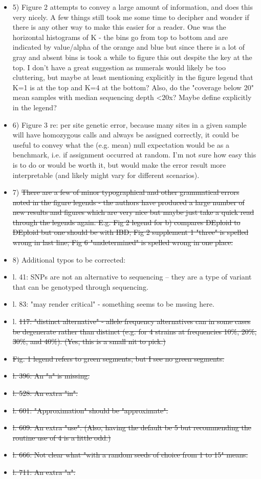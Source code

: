 \documentclass[11pt,twoside,a4paper]{article}
\begin{document}
\begin{itemize}
    \item 5) Figure 2 attempts to convey a large amount of information, and does this very nicely. A few things still took me some time to decipher and wonder if there is any other way to make this easier for a reader. One was the horizontal histograms of K - the bins go from top to bottom and are indicated by value/alpha of the orange and blue but since there is a lot of gray and absent bins is took a while to figure this out despite the key at the top. I don't have a great suggestion as numerals would likely be too cluttering, but maybe at least mentioning explicitly in the figure legend that K=1 is at the top and K=4 at the bottom? Also, do the "coverage below 20" mean samples with median sequencing depth <20x? Maybe define explicitly in the legend?

    \item 6) Figure 3 re: per site genetic error, because many sites in a given sample will have homozygous calls and always be assigned correctly, it could be useful to convey what the (e.g. mean) null expectation would be as a benchmark, i.e. if assignment occurred at random. I'm not sure how easy this is to do or would be worth it, but would make the error result more interpretable (and likely might vary for different scenarios).

    \item 7) \st{There are a few of minor typographical and other grammatical errors noted in the figure legends - the authors have produced a large number of new results and figures which are very nice but maybe just take a quick read through the legends again. E.g. Fig 2 legend for b) compares DEploid to DEploid but one should be with IBD; Fig 2 supplement 1 "three" is spelled wrong in last line; Fig 6 "undetermined" is spelled wrong in one place.}

    \item 8) Additional typos to be corrected:

\item l. 41: SNPs are not an alternative to sequencing -- they are a type of variant that can be genotyped through sequencing.
\item l. 83: "may render critical" - something seems to be mssing here.
\item l. \st{117: "distinct alternative" - allele frequency alternatives can in some cases be degenerate rather than distinct (e.g. for 4 strains at frequencies 10\%, 20\%, 30\%, and 40\%). (Yes, this is a small nit to pick.)}
\item \st{Fig. 1 legend refers to green segments, but I see no green segments.}
\item \st{l. 396: An "a" is missing.}
\item \st{l. 528: An extra "in".}
\item \st{l. 601: "Approximation" should be "approximate". }
\item \st{l. 609: An extra "use". (Also, having the default be 5 but recommending the routine use of 4 is a little odd.)}
\item \st{l. 666: Not clear what "with a random seeds of choice from 1 to 15" means.}
\item \st{l. 711: An extra "a".}
\end{itemize}
\end{document}

